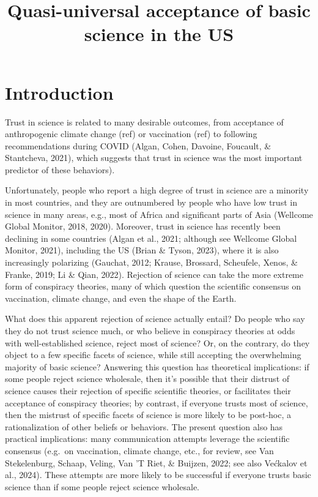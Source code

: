 \documentclass[
  doc,floatsintext]{apa6}
\title{Quasi-universal acceptance of basic science in the US}
\author{\textsuperscript{}}
\date{}
\affiliation{\vspace{0.5cm}\textsuperscript{} }
\begin{document}
\maketitle

\section{Introduction}\label{introduction}

Trust in science is related to many desirable outcomes, from acceptance of anthropogenic climate change (ref) or vaccination (ref) to following recommendations during COVID (Algan, Cohen, Davoine, Foucault, \& Stantcheva, 2021), which suggests that trust in science was the most important predictor of these behaviors).

Unfortunately, people who report a high degree of trust in science are a minority in most countries, and they are outnumbered by people who have low trust in science in many areas, e.g., most of Africa and significant parts of Asia (Wellcome Global Monitor, 2018, 2020). Moreover, trust in science has recently been declining in some countries (Algan et al., 2021; although see Wellcome Global Monitor, 2021), including the US (Brian \& Tyson, 2023), where it is also increasingly polarizing (Gauchat, 2012; Krause, Brossard, Scheufele, Xenos, \& Franke, 2019; Li \& Qian, 2022). Rejection of science can take the more extreme form of conspiracy theories, many of which question the scientific consensus on vaccination, climate change, and even the shape of the Earth.

What does this apparent rejection of science actually entail? Do people who say they do not trust science much, or who believe in conspiracy theories at odds with well-established science, reject most of science? Or, on the contrary, do they object to a few specific facets of science, while still accepting the overwhelming majority of basic science? Answering this question has theoretical implications: if some people reject science wholesale, then it's possible that their distrust of science causes their rejection of specific scientific theories, or facilitates their acceptance of conspiracy theories; by contrast, if everyone trusts most of science, then the mistrust of specific facets of science is more likely to be post-hoc, a rationalization of other beliefs or behaviors. The present question also has practical implications: many communication attempts leverage the scientific consensus (e.g.~on vaccination, climate change, etc., for review, see Van Stekelenburg, Schaap, Veling, Van 'T Riet, \& Buijzen, 2022; see also Većkalov et al., 2024). These attempts are more likely to be successful if everyone trusts basic science than if some people reject science wholesale.
\end{document}
